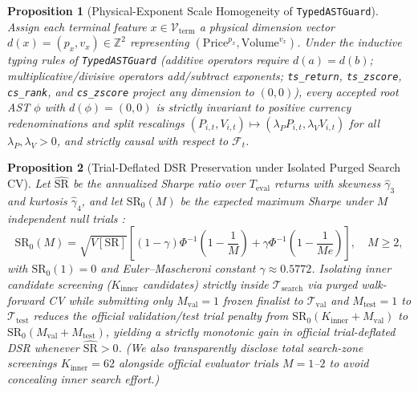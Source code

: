 \documentclass[11pt]{article}
\newtheorem{proposition}{Proposition}
\begin{document}
\begin{proposition}[Physical-Exponent Scale Homogeneity of \texttt{TypedASTGuard}]
\label{prop:homogeneity}
Assign each terminal feature $x \in \mathcal{V}_{\text{term}}$ a physical dimension vector $d(x) = (p_x, v_x) \in \mathbb{Z}^2$ representing $(\text{Price}^{p_x}, \text{Volume}^{v_x})$. Under the inductive typing rules of \texttt{TypedASTGuard} (additive operators require $d(a)=d(b)$; multiplicative/divisive operators add/subtract exponents; \texttt{ts\_return}, \texttt{ts\_zscore}, \texttt{cs\_rank}, and \texttt{cs\_zscore} project any dimension to $(0,0)$), every accepted root AST $\phi$ with $d(\phi)=(0,0)$ is strictly invariant to positive currency redenominations and split rescalings $(P_{i,t}, V_{i,t}) \mapsto (\lambda_P P_{i,t}, \lambda_V V_{i,t})$ for all $\lambda_P, \lambda_V > 0$, and strictly causal with respect to $\mathcal{F}_t$.
\end{proposition}

\begin{proposition}[Trial-Deflated DSR Preservation under Isolated Purged Search CV]
\label{prop:dsr_bound}
Let $\widehat{\text{SR}}$ be the annualized Sharpe ratio over $T_{\text{eval}}$ returns with skewness $\hat{\gamma}_3$ and kurtosis $\hat{\gamma}_4$, and let $\text{SR}_0(M)$ be the expected maximum Sharpe under $M$ independent null trials \citep{bailey2014deflated}:
\begin{equation}
  \text{SR}_0(M) = \sqrt{V[\text{SR}]} \left[(1-\gamma)\Phi^{-1}\!\left(1 - \frac{1}{M}\right) + \gamma \Phi^{-1}\!\left(1 - \frac{1}{M e}\right)\right], \quad M \ge 2,
  \label{eq:sr0}
\end{equation}
with $\text{SR}_0(1) = 0$ and Euler--Mascheroni constant $\gamma \approx 0.5772$. Isolating inner candidate screening ($K_{\text{inner}}$ candidates) strictly inside $\mathcal{T}_{\text{search}}$ via purged walk-forward CV while submitting only $M_{\text{val}} = 1$ frozen finalist to $\mathcal{T}_{\text{val}}$ and $M_{\text{test}} = 1$ to $\mathcal{T}_{\text{test}}$ reduces the official validation/test trial penalty from $\text{SR}_0(K_{\text{inner}} + M_{\text{val}})$ to $\text{SR}_0(M_{\text{val}} + M_{\text{test}})$, yielding a strictly monotonic gain in official trial-deflated DSR whenever $\widehat{\text{SR}} > 0$. \emph{(We also transparently disclose total search-zone screenings $K_{\text{inner}}=62$ alongside official evaluator trials $M=1$--$2$ to avoid concealing inner search effort.)}
\end{proposition}
\end{document}
